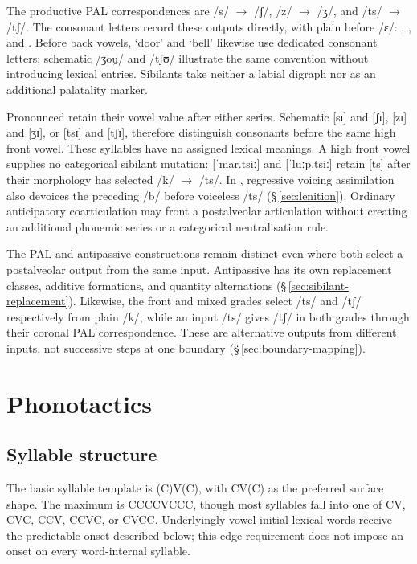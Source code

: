 The productive PAL correspondences are /s/ $\rightarrow$ /ʃ/, /z/
$\rightarrow$ /ʒ/, and /ts/ $\rightarrow$ /tʃ/. The consonant letters
record these outputs directly, with plain  before /ɛ/:
, , and . Before back vowels, 
`door' and  `bell' likewise use dedicated consonant letters;
schematic  /ʒou̯/ and  /tʃʊ/ illustrate the same
convention without introducing lexical entries. Sibilants take neither
a labial  digraph nor  as an additional palatality marker.

Pronounced  retain their vowel value after either series.
Schematic  [sɪ] and  [ʃɪ],  [zɪ] and
 [ʒɪ], or  [tsɪ] and  [tʃɪ], therefore
distinguish consonants before the same high front vowel. These syllables have
no assigned lexical meanings. A high front vowel supplies no categorical sibilant mutation:  [ˈmar.tsiː]
and  [ˈluːp.tsiː] retain [ts] after their morphology has selected
/k/ $\rightarrow$ /ts/. In , regressive voicing assimilation
also devoices the preceding /b/ before voiceless /ts/
(§\,\ref{sec:lenition}). Ordinary anticipatory coarticulation may front a
postalveolar articulation without creating an additional phonemic series
or a categorical neutralisation rule.

The PAL and antipassive constructions remain distinct even where both select
a postalveolar output from the same input. Antipassive  has
its own replacement classes, additive formations, and quantity alternations
(§\,\ref{sec:sibilant-replacement}). Likewise, the front and mixed grades select /ts/ and /tʃ/ respectively
from plain /k/, while an input /ts/ gives /tʃ/ in both grades through
their coronal PAL correspondence. These are alternative outputs from
different inputs, not successive steps at one boundary
(§\,\ref{sec:boundary-mapping}).


\section{Phonotactics}

\subsection{Syllable structure}

The basic syllable template is (C)V(C), with CV(C) as the preferred
surface shape. The maximum is CCCCVCCC, though most syllables fall into
one of CV, CVC, CCV, CCVC, or CVCC. Underlyingly vowel-initial lexical
words receive the predictable onset described below; this edge requirement
does not impose an onset on every word-internal syllable.

